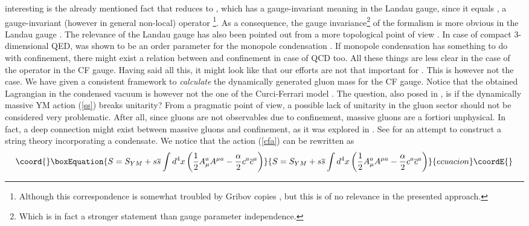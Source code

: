 \documentclass[a4paper,12pt]{article}
\begin{document}
interesting is the already mentioned fact that \coordHE{}
reduces to \coordHE{}, which has a gauge-invariant meaning in the
Landau gauge, since it equals \coordHE{}, a gauge-invariant (however in general non-local) operator%
\footnote{%
Although this correspondence is somewhat troubled by Gribov copies \cite
{Stodolsky:2002st}, but this is of no relevance in the presented approach.}.
As a consequence, the gauge invariance\footnote{%
Which is in fact a stronger statement than gauge parameter
independence.} of the formalism is more obvious in the Landau
gauge \cite{v1}. The relevance of the Landau gauge has also been
pointed out from a more topological point of view
\cite{Gubarev:2000nz}. In case of compact 3-dimensional QED,
\coordHE{} was shown to be an order parameter for the monopole
condensation \cite {Gubarev:2000eu,Gubarev:2000nz}. If monopole
condensation has something to do with confinement, there might
exist a relation between \coordHE{} and confinement in case of QCD
too. All these things are less clear in the case of the
\coordHE{} operator in the CF gauge.\newline
\newline
Having said all this, it might look like that our efforts are not
that important for \coordHE{}. This is however not the case.
We have given a consistent framework to \emph{calculate} the
dynamically generated gluon mass for the CF gauge. Notice that the
obtained Lagrangian in the condensed vacuum is however not the one
of the Curci-Ferrari model \cite {Curci:bt,Curci:1976ar}. The
question, also posed in \cite{v1}, is if the dynamically massive
YM action (\ref{ss}) breaks unitarity? From a pragmatic point of
view, a possible lack of unitarity in the gluon sector should not
be considered very problematic. After all, since gluons are not
observables due to confinement, massive gluons are a fortiori
unphysical. In fact, a deep connection might exist between massive
gluons and confinement, as it was explored in \cite{Kugo:gm}. See
\cite{Kondo:2002xn} for an attempt to construct a string theory
incorporating a \coordHE{} condensate.
\newline
\newline
We notice that the action (\ref{cfa}) can be rewritten as
\begin{equation}\coord{}\boxEquation{
S=S_{YM}+s\overline{s}\int d^{4}x\left( \frac{1}{2}A_{\mu }^{a}A^{\mu a}-
\frac{\alpha }{2}c^{a}\overline{c}^{a}\right)   \label{cfa2}
}{
S=S_{YM}+s\overline{s}\int d^{4}x\left( \frac{1}{2}A_{\mu }^{a}A^{\mu a}-
\frac{\alpha }{2}c^{a}\overline{c}^{a}\right)   }{ecuacion}\coordE{}\end{equation}
\end{document}
